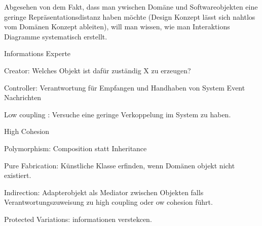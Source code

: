 Abgesehen von dem Fakt, dass man ywischen Domäne und Softwareobjekten eine geringe Repräsentationsdistanz
haben möchte (Design Konzept lässt sich nahtlos vom Domänen Konzept ableiten), will man wissen,
wie man Interaktions Diagramme systematisch erstellt.
\begin{compactenum}
    \item Informations Experte
    \item Creator: Welches Objekt ist dafür zuständig X zu erzeugen?
    \item Controller: Verantwortung für Empfangen und Handhaben von System Event Nachrichten
    \item Low coupling : Versuche eine geringe Verkoppelung im System zu haben.
    \item High Cohesion
    \item Polymorphism: Composition statt Inheritance
    \item Pure Fabrication: Künstliche Klasse erfinden, wenn Domänen objekt nicht existiert.
    \item Indirection: Adapterobjekt als Mediator zwischen Objekten falls Verantwortungszuweisung zu
    high coupling oder ow cohesion führt.
    \item Protected Variations: informationen verstekcen.

\end{compactenum}
